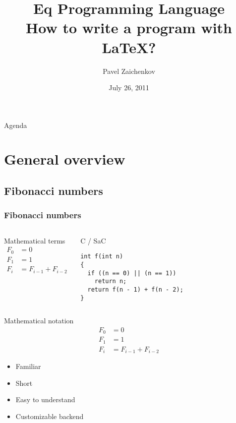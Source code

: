 \documentclass[xcolor=dvipsnames,mathserif,professionalfont,12pt]{beamer}
\title[Eq Programming Language]{Eq Programming Language\\How to write a program
with \LaTeX?}
\author[Pavel Zaichenkov]{Pavel Zaichenkov}
\institute[UoH]{University of Hertfordshire}
\date{July 26, 2011}
\begin{document}
\begin{frame}
  \titlepage
\end{frame}

\begin{frame}{Agenda}
  \tableofcontents
\end{frame}

\section{General overview}
\subsection{Fibonacci numbers}

\begin{frame}[fragile]
  \frametitle{Fibonacci numbers}
  \begin{columns}[t]
      \begin{block}{Mathematical terms}
        \begin{align*}
F_0 &= 0  \\
F_1 &= 1  \\ 
F_i &= F_{i-1} + F_{i-2}
        \end{align*}
      \end{block}
      \begin{block}{C / SaC}
        \begin{lstlisting}
int f(int n)
{
  if ((n == 0) || (n == 1))
    return n;
  return f(n - 1) + f(n - 2);
}
        \end{lstlisting}
    \end{block}
  \end{columns}
\end{frame}

\begin{frame}
      \begin{block}{Mathematical notation}
        \begin{align*}
F_0 &= 0  \\
F_1 &= 1  \\ 
F_i &= F_{i-1} + F_{i-2}
        \end{align*}
      \end{block}
      \begin{itemize}
        \item Familiar
        \item Short
        \item Easy to understand
        \item Customizable backend
      \end{itemize}
\end{frame}
 
\end{document}
